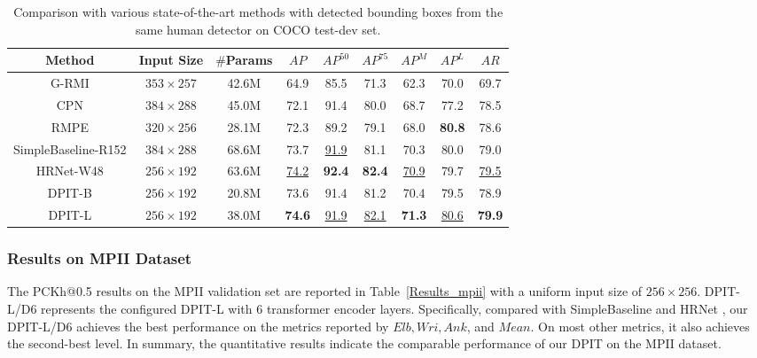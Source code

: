 \documentclass[runningheads]{llncs}
\begin{document}
\begin{center}
\begin{table}
  \caption{Comparison with various state-of-the-art methods with detected bounding boxes from the same human detector on COCO test-dev set.}
  \label{test_coco}
  \begin{center}
  \begin{tabular}{c|c|c|cccccc}
  \toprule
  Method  & Input Size  & $\#$Params  & $AP$ & $AP^{50}$  & $AP^{75}$  & $AP^{M}$  & $AP^{L}$ & $AR$ \\
  \midrule
  \midrule
   G-RMI \cite{G-RMI2017}  & $353 \times 257$  & 42.6M  & 64.9 & 85.5  & 71.3 &  62.3  & 70.0 & 69.7    \\
   CPN \cite{CPN2018}  & $384 \times 288$  & 45.0M  & 72.1 & 91.4  & 80.0  & 68.7  & 77.2 & 78.5    \\
  RMPE \cite{RMPE2017}   & $320 \times 256$  & 28.1M  & 72.3  & 89.2 & 79.1  & 68.0  & \textbf{80.8}  & 78.6    \\
  SimpleBaseline-R152 \cite{simple_baseline2018}   & $384 \times 288$  & 68.6M  & 73.7  & \underline{91.9} & 81.1  & 70.3  & 80.0  & 79.0    \\
  HRNet-W48 \cite{HRNet2019}   & $256 \times 192$  & 63.6M  & \underline{74.2} & \textbf{92.4}  & \textbf{82.4}  & \underline{70.9}  & 79.7 & \underline{79.5}    \\
  \midrule
  DPIT-B   & $256 \times 192$  & 20.8M  & 73.6 & 91.4  & 81.2  & 70.4  & 79.5 & 78.9    \\
  DPIT-L   & $256 \times 192$  & 38.0M  & \textbf{74.6} & \underline{91.9}  & \underline{82.1}  & \textbf{71.3}  & \underline{80.6} & \textbf{79.9}    \\
  \bottomrule
  \end{tabular}
  \end{center}
\end{table}
\end{center}


\subsubsection{Results on MPII Dataset}
The PCKh@0.5 results on the MPII validation set are reported in Table~\ref{Results_mpii} with a uniform input size of $256 \times 256$. DPIT-L/D6 represents the configured DPIT-L with 6 transformer encoder layers. Specifically, compared with SimpleBaseline \cite{simple_baseline2018} and HRNet \cite{HRNet2019}, our DPIT-L/D6 achieves the best performance on the metrics reported by $Elb, Wri, Ank$, and $Mean$. On most other metrics, it also achieves the second-best level. In summary, the quantitative results indicate the comparable performance of our DPIT on the MPII dataset.
\end{document}
